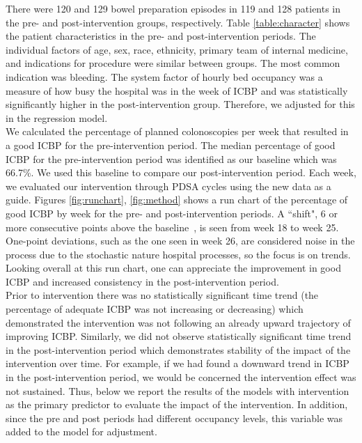 \documentclass[Bprep]{subfiles}
\begin{document}


There were 120 and 129 bowel preparation episodes in 119 and 128 patients in the pre- and post-intervention groups, respectively. Table \ref{table:character} shows the patient characteristics in the pre- and post-intervention periods. The individual factors of age, sex, race, ethnicity, primary team of internal medicine, and indications for procedure were similar between groups. The most common indication was bleeding. The system factor of hourly bed occupancy
was a measure of how busy the hospital was in the week of ICBP and was statistically significantly higher in the post-intervention group. Therefore, we adjusted for this in the regression model.\\



We calculated the percentage of planned colonoscopies per week that resulted in a good ICBP for the pre-intervention period. The median percentage of good ICBP for the pre-intervention period was identified as our baseline which was 66.7\%. We used this baseline to compare our post-intervention period. Each week, we evaluated our intervention through PDSA cycles using the new data as a guide. Figures \ref{fig:runchart}, \ref{fig:method} shows a run chart of the percentage
of good ICBP by week for the pre- and post-intervention periods. A ``shift", 6 or more consecutive points above the baseline~\cite{Perla2011-dp}, is seen from week 18 to week 25. One-point deviations, such as the one seen in week 26, are considered noise in the process due to the stochastic
nature hospital processes, so the focus is on trends. Looking overall at this run chart, one can appreciate the improvement in good ICBP and increased consistency in the post-intervention period.\\





Prior to intervention there was no statistically significant time trend (the percentage of adequate ICBP was not increasing or decreasing) which demonstrated the intervention was not following an already upward trajectory of improving ICBP. Similarly, we did not observe statistically
significant time trend in the post-intervention period which demonstrates stability of the impact of the intervention over time. For example, if we had found a downward trend in ICBP in the post-intervention period, we would be concerned the intervention effect was not sustained. Thus, below we report the results of the models with intervention as the primary predictor to evaluate the impact of the intervention. In addition, since the pre and post periods had different occupancy levels, this variable was added to the model for adjustment.\\
\end{document}
